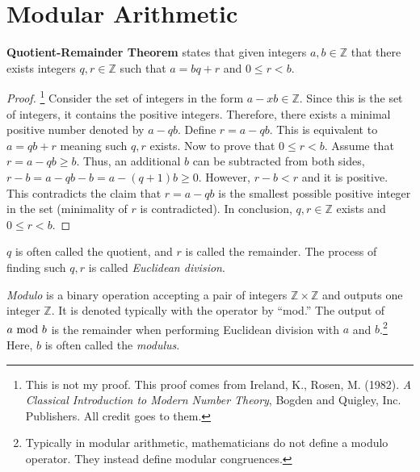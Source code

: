 
\section{Modular Arithmetic}

\begin{theorem}
    \textbf{Quotient-Remainder Theorem} states that given integers \(a,b\in\mathbb{Z}\) that there exists integers \(q,r\in\mathbb{Z}\) 
    such that \(a=bq+r\) and \(0\le r<b\). 
\end{theorem}
\begin{proof}
    \footnote{This is not my proof. This proof comes from Ireland, K., Rosen, M. (1982). \emph{A Classical Introduction to Modern Number Theory}, Bogden and Quigley, Inc. 
    Publishers. All credit goes to them.} Consider the set of integers in the form \(a-xb\in\mathbb{Z}\). Since this is the set of integers, it contains the positive integers.
    Therefore, there exists a minimal positive number denoted by \(a-qb\). Define \(r=a-qb\). This is equivalent to \(a=qb+r\) meaning such \(q,r\) exists. Now to prove that
    \(0\le r<b\). Assume that \(r=a-qb\ge b\). Thus, an additional \(b\) can be subtracted from both sides, \(r-b=a-qb-b=a-(q+1)b\ge0\). However, \(r-b<r\) and it is positive.
    This contradicts the claim that \(r=a-qb\) is the smallest possible positive integer in the set (minimality of \(r\) is contradicted). In conclusion, \(q,r\in\mathbb{Z}\)
    exists and \(0\le r<b\).
\end{proof}

\(q\) is often called the quotient, and \(r\) is called the remainder. The process of finding such \(q,r\) is called \emph{Euclidean division}.
\bigskip
\begin{definition}
    \emph{Modulo} is a binary operation accepting a pair of integers \(\mathbb{Z}\times\mathbb{Z}\) and outputs one integer \(\mathbb{Z}\). It is denoted typically with the
    operator by ``mod.'' The output of \(a\text{ mod } b\) is the remainder when performing Euclidean division with \(a\) and \(b\).\footnote{Typically in modular arithmetic, mathematicians
    do not define a modulo operator. They instead define modular congruences.} Here, \(b\) is often called the \emph{modulus}.
\end{definition}

